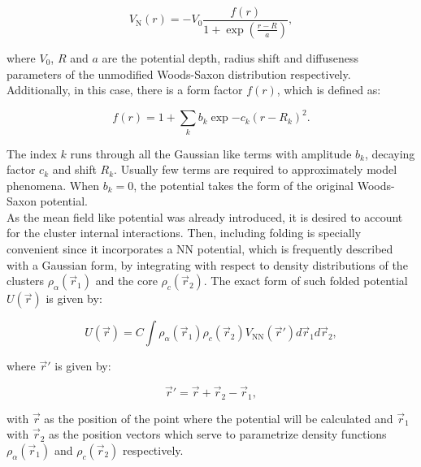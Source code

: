 \documentclass[openany]{book}
\begin{document}
\begin{equation}\label{eq:micro_doubleFolding_potential_N}
	V_{\mathrm{N}}(r) = - V_0 \frac{f(r)}{1 + \exp {\left( \frac{r - R}{a}\right)}},
\end{equation}

where $V_0$, $R$ and $a$ are the potential depth,  radius shift and diffuseness parameters of the unmodified Woods-Saxon distribution respectively. Additionally, in this case, there is a form factor $f(r)$, which is defined as: 

 \begin{equation}\label{eq:micro_doubleFolding_potential_formFactor}
	 f(r) =  1+ \sum_k{ b_k \exp  {-c_k(r - R_k)^2}}.
 \end{equation} 

The index $k$ runs through all the Gaussian like terms with amplitude $b_k$, decaying factor $c_k$ and shift $R_k$. Usually few terms are required to approximately model phenomena. When $b_k = 0$, the potential takes the form of the original Woods-Saxon potential.  \\

As the mean field like potential was already introduced, it is desired to account for the cluster internal interactions. Then, including folding is specially convenient since it incorporates a $\mathrm{NN}$ potential, which is frequently described with a Gaussian form, by integrating with respect to density distributions of the clusters $\rho_\alpha(\vec r_1)$ and the core  $\rho_c(\vec r_2)$. The exact form of such folded potential $U(\vec r)$ is given by:

\begin{equation}\label{eq:micro_doubleFolding_potential}
	U(\vec r) = C \int { \rho_\alpha(\vec r_1) \rho_c (\vec r_2) V_{\mathrm{NN}} (\vec r') d\vec r_1 d\vec r_2},
\end{equation}

where $\vec r'$ is given by:

\begin{equation}\label{eq:micro_doubleFolding_potential_separationVector}
	\vec r' = \vec r + \vec r_2 - \vec r_1,
\end{equation}

with $\vec r$ as the position of the point where the potential will be calculated and $\vec r_1$ with $\vec r_2$ as the position vectors which serve to parametrize density functions  $\rho_\alpha(\vec r_1)$ and  $\rho_c(\vec r_2)$ respectively. \\
\end{document}
